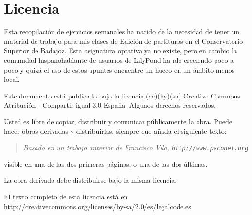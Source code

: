 \section*{Licencia}

Esta recopilación de ejercicios semanales ha nacido de la necesidad de
tener un material de trabajo para mis clases de Edición de partituras
en el Conservatorio Superior de Badajoz.  Esta asignatura optativa ya
no existe, pero en cambio la comunidad hispanohablante de usuarios de
LilyPond ha ido creciendo poco a poco y quizá el uso de estos apuntes
encuentre un hueco en un ámbito menos local.

Este documento está publicado bajo la licencia (cc)(by)(sa) Creative
Commons Atribución - Compartir igual 3.0 España.  Algunos derechos
reservados.

Usted es libre de copiar, distribuir y comunicar públicamente la obra.
Puede hacer obras derivadas y distribuirlas, siempre que añada el
siguiente texto:

\begin{quote}
\emph{Basado en un trabajo anterior de Francisco Vila,
  \texttt{http://www.paconet.org} }
\end{quote}

visible en una de las dos primeras páginas, o una de las dos últimas.

La obra derivada debe distribuirse bajo la misma licencia.

El texto completo de esta licencia está en
http://creativecommons.org/licenses/by-sa/2.0/es/legalcode.es




